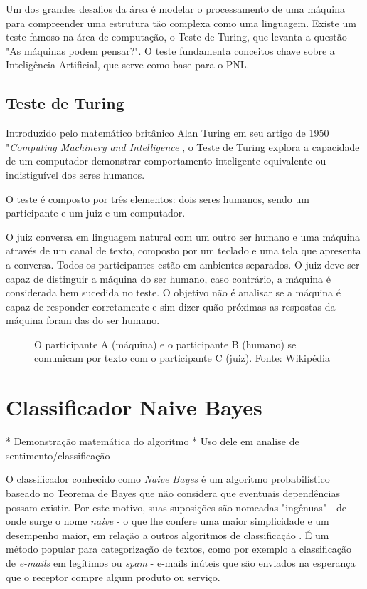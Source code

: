 Um dos grandes desafios da área é modelar o processamento de uma máquina para compreender uma estrutura tão complexa como uma linguagem. Existe um teste famoso na área de computação, o Teste de Turing, que levanta a questão "As máquinas podem pensar?". O teste fundamenta conceitos chave sobre a Inteligência Artificial, que serve como base para o PNL.

\subsection{Teste de Turing}

Introduzido pelo matemático britânico Alan Turing em seu artigo de 1950 "\textit{Computing Machinery and Intelligence} \cite{turing1950computing}, o Teste de Turing explora a capacidade de um computador demonstrar comportamento inteligente equivalente ou indistiguível dos seres humanos.

O teste é composto por três elementos: dois seres humanos, sendo um participante e um juiz e um computador.

O juiz conversa em linguagem natural com um outro ser humano e uma máquina através de um canal de texto, composto por um teclado e uma tela que apresenta a conversa. Todos os participantes estão em ambientes separados. O juiz deve ser capaz de distinguir a máquina do ser humano, caso contrário, a máquina é considerada bem sucedida no teste. O objetivo não é analisar se a máquina é capaz de responder corretamente e sim dizer quão próximas as respostas da máquina foram das do ser humano.  

\begin{figure}[H]
	\centering{}
	\caption{O participante A (máquina) e o participante B (humano) se comunicam por texto com o participante C (juiz). Fonte: Wikipédia}
	\label{uni}
\end{figure}


\section{Classificador Naive Bayes}\label{sec:naive_bayes}
* Demonstração matemática do algoritmo
* Uso dele em analise de sentimento/classificação


O classificador conhecido como \textit{Naive Bayes} é um algoritmo probabilístico baseado no Teorema de Bayes que não considera que eventuais dependências possam existir. Por este motivo, suas suposições são nomeadas "ingênuas" - de onde surge o nome \textit{naive} - o que lhe confere uma maior simplicidade e um desempenho maior, em relação a outros algoritmos de classificação \cite{rennie2003tackling}. É um método popular para categorização de textos, como por exemplo a classificação de \textit{e-mails} em legítimos ou \textit{spam} - e-mails inúteis que são enviados na esperança que o receptor compre algum produto ou serviço. \cite{androutsopoulos2000evaluation}

